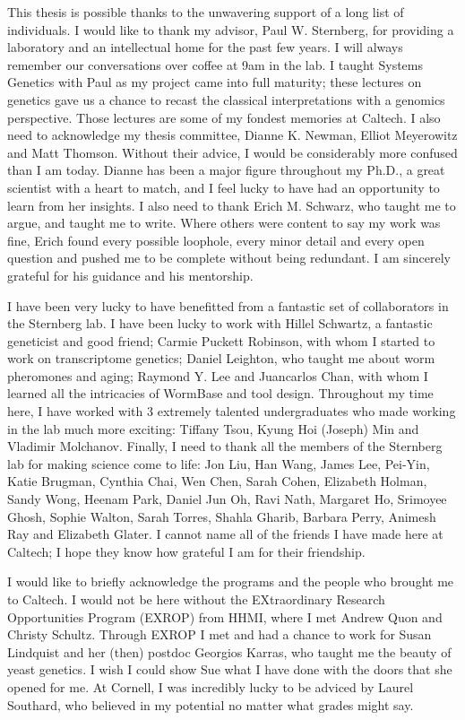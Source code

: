 \documentclass[12pt]{caltech_thesis}
\begin{document}
\begin{acknowledgements}
  This thesis is possible thanks to the unwavering support of a long list of
  individuals. I would like to thank my advisor, Paul W. Sternberg, for
  providing a laboratory and an intellectual home for the past few years. I will
  always remember our conversations over coffee at 9am in the lab. I taught
  Systems Genetics with Paul as my project came into full maturity; these
  lectures on genetics gave us a chance to recast the classical interpretations
  with a genomics perspective. Those lectures are some of my fondest memories
  at Caltech. I also need to acknowledge my thesis committee, Dianne K. Newman,
  Elliot Meyerowitz and Matt Thomson. Without their advice, I would be
  considerably more confused than I am today. Dianne has been a major figure
  throughout my Ph.D., a great scientist with a heart to match, and I feel
  lucky to have had an opportunity to learn from her insights. I also need to
  thank Erich M. Schwarz, who taught me to argue, and taught me to write. Where
  others were content to say my work was fine, Erich found every possible
  loophole, every minor detail and every open question and pushed me to be
  complete without being redundant. I am sincerely grateful for his guidance and
  his mentorship.

  I have been very lucky to have benefitted from a fantastic set of
  collaborators in the Sternberg lab. I have been lucky to work with Hillel
  Schwartz, a fantastic geneticist and good friend; Carmie Puckett Robinson,
  with whom I started to work on transcriptome genetics; Daniel Leighton, who
  taught me about worm pheromones and aging; Raymond Y. Lee and Juancarlos Chan,
  with whom I learned all the intricacies of WormBase and tool design.
  Throughout my time here, I have worked with 3 extremely talented
  undergraduates who made working in the lab much more exciting: Tiffany Tsou,
  Kyung Hoi (Joseph) Min and Vladimir Molchanov. Finally, I need to thank all
  the members of the Sternberg lab for making science come to life: Jon Liu, Han
  Wang, James Lee, Pei-Yin, Katie Brugman, Cynthia Chai, Wen Chen, Sarah Cohen,
  Elizabeth Holman, Sandy Wong, Heenam Park, Daniel Jun Oh, Ravi Nath, Margaret
  Ho, Srimoyee Ghosh, Sophie Walton, Sarah Torres, Shahla Gharib, Barbara Perry,
  Animesh Ray and Elizabeth Glater. I cannot name all of the friends I have
  made here at Caltech; I hope they know how grateful I am for their friendship.

  I would like to briefly acknowledge the programs and the people who brought me
  to Caltech. I would not be here without the EXtraordinary Research
  Opportunities Program (EXROP) from HHMI, where I met Andrew Quon and Christy
  Schultz. Through EXROP I met and had a chance to work for Susan Lindquist and
  her (then) postdoc Georgios Karras, who taught me the beauty of yeast
  genetics. I wish I could show Sue what I have done with the doors that she
  opened for me. At Cornell, I was incredibly lucky to be adviced by Laurel
  Southard, who believed in my potential no matter what grades might say.


\end{acknowledgements}
\end{document}
